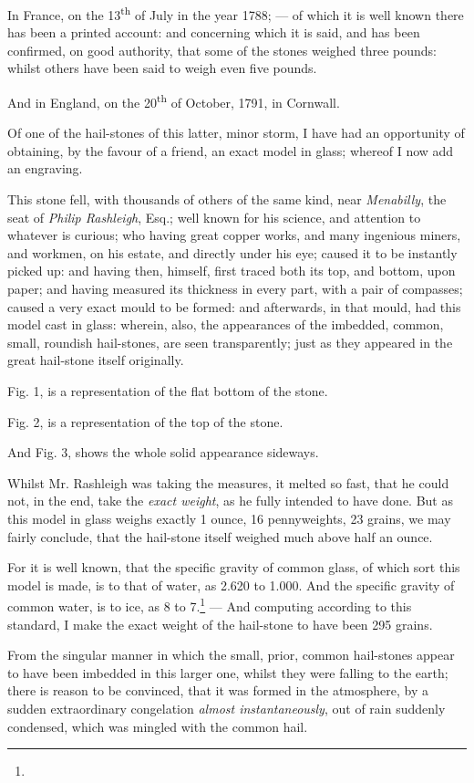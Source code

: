 \documentclass[a4paper, 12pt, oneside]{article}
\begin{document}
In France, on the 13\textsuperscript{th} of July in the year 1788; --- of which it is well known there has been a printed account: and concerning which it is said, and has been confirmed, on good authority, that some of the stones weighed three pounds: whilst others have been said to weigh even five pounds.

And in England, on the 20\textsuperscript{th} of October, 1791, in Cornwall.

Of one of the hail-stones of this latter, minor storm, I have had an opportunity of obtaining, by the favour of a friend, an exact model in glass; whereof I now add an engraving.

This stone fell, with thousands of others of the same kind, near \emph{Menabilly}, the seat of \emph{Philip Rashleigh}, Esq.; well known for his science, and attention to whatever is curious; who having great copper works, and many ingenious miners, and workmen, on his estate, and directly under his eye; caused it to be instantly picked up: and having then, himself, first traced both its top, and bottom, upon paper; and having measured its thickness in every part, with a pair of compasses; caused a very exact mould to be formed: and afterwards, in that mould, had this model cast in glass: wherein, also, the appearances of the imbedded, common, small, roundish hail-stones, are seen transparently; just as they appeared in the great hail-stone itself originally.

Fig. 1, is a representation of the flat bottom of the stone.

Fig. 2, is a representation of the top of the stone.

And Fig. 3, shows the whole solid appearance sideways.

Whilst Mr. Rashleigh was taking the measures, it melted so fast, that he could not, in the end, take the \emph{exact weight}, as he fully intended to have done. But as this model in glass weighs exactly 1 ounce, 16 pennyweights, 23 grains, we may fairly conclude, that the hail-stone itself weighed much above half an ounce.

For it is well known, that the specific gravity of common glass, of which sort this model is made, is to that of water, as 2.620 to 1.000. And the specific gravity of common water, is to ice, as 8 to 7.\footnote{} --- And computing according to this standard, I make the exact weight of the hail-stone to have been 295 grains.

From the singular manner in which the small, prior, common hail-stones appear to have been imbedded in this larger one, whilst they were falling to the earth; there is reason to be convinced, that it was formed in the atmosphere, by a sudden extraordinary congelation \emph{almost instantaneously}, out of rain suddenly condensed, which was mingled with the common hail.
\end{document}
